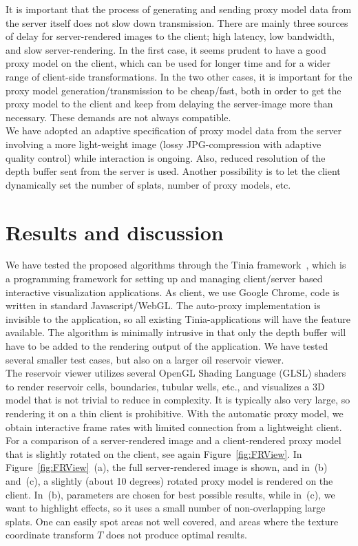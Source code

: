 \documentclass[10pt,conference,compsocconf]{IEEEtran}
\begin{document}
It is important that the process of generating and sending proxy model data from
the server itself does not slow down transmission.  There are mainly three
sources of delay for server-rendered images to the client; high latency, low
bandwidth, and slow server-rendering.  In the first case, it seems prudent to
have a good proxy model on the client, which can be used for longer time and for
a wider range of client-side transformations.  In the two other cases, it is
important for the proxy model generation/transmission to be cheap/fast, both in order
to get the proxy model to the client and keep from delaying the server-image
more than necessary. These demands are not always compatible.
\\
We have adopted an adaptive specification of proxy model data from the server
involving a more light-weight image (lossy JPG-compression with adaptive quality
control) while interaction is ongoing.  Also, reduced resolution of the depth
buffer sent from the server is used. Another possibility is to let the client
dynamically set the number of splats, number of proxy models, etc.


\section{Results and discussion}
\label{sec:results}

We have tested the proposed algorithms through the Tinia 
framework~\cite{tinia}, which is a programming framework for
setting up and managing client/server based interactive visualization
applications. As client, we use Google Chrome, code is written
in standard Javascript/WebGL.  The auto-proxy implementation is invisible to the
application, so all existing Tinia-applications will have the feature
available. The algorithm is minimally intrusive in that only the depth buffer
will have to be added to the rendering output of the application. We have tested
several smaller test cases, but also on a larger oil reservoir viewer.
\\
The reservoir viewer utilizes several OpenGL Shading Language (GLSL) shaders to
render reservoir cells, boundaries, tubular wells, etc., and visualizes a 3D
model that is not trivial to reduce in complexity. It is typically also very
large, so rendering it on a thin client is prohibitive. With the automatic proxy
model, we obtain interactive frame rates with limited connection from a
lightweight client. For a comparison of a server-rendered image and a
client-rendered proxy model that is slightly rotated on the client, see again
Figure~\ref{fig:FRView}. In Figure~\ref{fig:FRView}~(a), the full
server-rendered image is shown, and in~(b) and~(c), a slightly (about 10
degrees) rotated proxy model is rendered on the client. In~(b), parameters are
chosen for best possible results, while in~(c), we want to highlight effects, so
it uses a small number of non-overlapping large splats. One can easily spot
areas not well covered, and areas where the texture coordinate transform $T$
does not produce optimal results.
\end{document}
